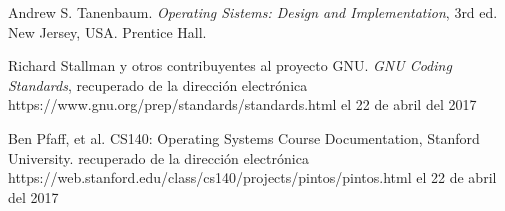\documentclass[letterpaper,journal,12pt]{IEEEtran}
\begin{document}
\begin{thebibliography}{1}

Andrew S. Tanenbaum. \textit{Operating Sistems: Design and Implementation}, 3rd ed. New Jersey, USA. Prentice Hall.

Richard Stallman y otros contribuyentes al proyecto GNU. \textit{GNU Coding Standards}, recuperado de la dirección electrónica https://www.gnu.org/prep/standards/standards.html el 22 de abril del 2017

Ben Pfaff, et al. CS140: Operating Systems Course Documentation, Stanford University. recuperado de la dirección electrónica https://web.stanford.edu/class/cs140/projects/pintos/pintos.html el 22 de abril del 2017

\end{thebibliography}
\end{document}
